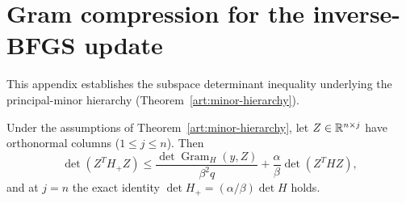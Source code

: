 \section{Gram compression for the inverse-BFGS update}\label{art:matrix-algebra}

This appendix establishes the subspace determinant inequality underlying the
principal-minor hierarchy (Theorem~\ref{art:minor-hierarchy}).

\begin{lemma}\label{art:gram-compression}
Under the assumptions of Theorem~\ref{art:minor-hierarchy}, let $Z\in\mathbb R^{n\times j}$
have orthonormal columns ($1\le j\le n$). Then
\[
 \det(Z^TH_+Z)\le
 \frac{\det\operatorname{Gram}_H(y,Z)}{\beta^2q}
       +\frac\alpha\beta\det(Z^THZ),
\]
and at $j=n$ the exact identity $\det H_+=(\alpha/\beta)\det H$ holds.
\end{lemma}
